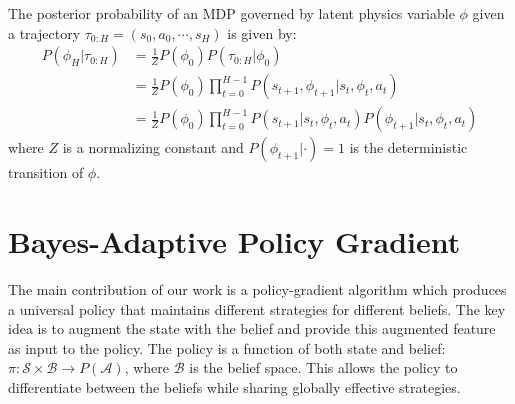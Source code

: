 \documentclass{article}
\DeclareMathOperator*{\argmax}{arg\,max}
\begin{document}

The posterior probability of an MDP governed by latent physics variable $\phi$ given a trajectory $\tau_{0:H} = (s_0, a_0, \cdots, s_H)$ is given by:
\begin{align}
P(\phi_H | \tau_{0:H})
  &= \frac{1}{Z} P(\phi_0) P(\tau_{0:H} | \phi_0) \nonumber \\
  &= \frac{1}{Z} P(\phi_0) \prod_{t=0}^{H-1} P(s_{t+1}, \phi_{t+1} | s_t, \phi_t, a_t) \nonumber \\
  &= \frac{1}{Z} P(\phi_0) \prod_{t=0}^{H-1} P(s_{t+1}|s_t, \phi_t, a_t) P(\phi_{t+1} | s_t, \phi_t, a_t)
\end{align}
where $Z$ is a normalizing constant and $P(\phi_{t+1} | \cdot) = 1$ is the deterministic transition of $\phi$.


\section{Bayes-Adaptive Policy Gradient}



The main contribution of our work is a policy-gradient algorithm which produces a universal policy that maintains different strategies for different beliefs. The key idea is to augment the state with the belief and provide this augmented feature as input to the policy. The policy is a function of both state and belief: $\pi: \mathcal{S} \times \mathcal{B} \rightarrow P(\mathcal{A})$, where $\mathcal{B}$ is the belief space. This allows the policy to differentiate between the beliefs while sharing globally effective strategies.
\end{document}
